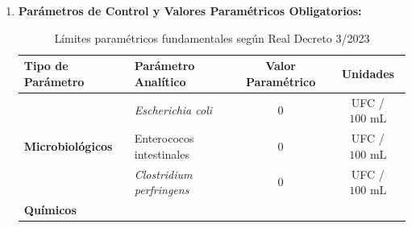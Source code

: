 \documentclass{report}
\begin{document}
\begin{enumerate}
          \begin{itemize}

              \item Identificación de peligros fisicoquímicos y microbiológicos.

              \item Control analítico periódico en puntos de entrega y grifos testigos.

              \item Registro de parámetros de control en el sistema informático \textbf{SINAC} (Sistema de Información Nacional de Aguas de Consumo).

          \end{itemize}

    \item \textbf{Parámetros de Control y Valores Paramétricos Obligatorios:}

          \begin{table}[H]

              \centering

              \small

              \caption{Límites paramétricos fundamentales según Real Decreto 3/2023}

              \label{tab:parametros_rd3_2023}

              \begin{tabularx}{\textwidth}{@{}lXcc@{}}

                  \toprule

                  \textbf{Tipo de Parámetro} & \textbf{Parámetro Analítico} & \textbf{Valor Paramétrico} & \textbf{Unidades} \\

                  \midrule

                  \multirow{3}{*}{\textbf{Microbiológicos}} 

                  & \textit{Escherichia coli} & $0$ & UFC / $100\text{ mL}$ \\

                  & Enterococos intestinales & $0$ & UFC / $100\text{ mL}$ \\

                  & \textit{Clostridium perfringens} & $0$ & UFC / $100\text{ mL}$ \\

                  \midrule

                  \multirow{4}{*}{\textbf{Químicos}} 


\end{tabularx}
\end{table}
\end{enumerate}
\end{document}

